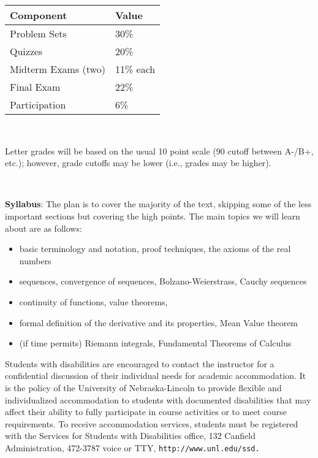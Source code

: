 \documentclass{amsart}
\begin{document}
\begin{tabular}{|l|l|}
\hline
Component & Value \\
\hline \hline
Problem Sets & 30\% \\
\hline
Quizzes & 20\% \\
\hline
Midterm Exams (two) &  11\% each \\
\hline
Final Exam & 22\% \\
\hline
Participation & 6\%\\
\hline
\end{tabular}


\


\noindent Letter grades will be based on the usual 10 point scale (90 cutoff between A-/B+, etc.); however, grade cutoffs may be lower (i.e., grades may be higher).

\

\noindent
{\bf Syllabus}: The plan is to cover the majority of the text, skipping some of the less important sections but covering the high points.
The main topics we will learn about are as follows:
\begin{itemize}
  \item 
    basic terminology and  notation, proof techniques, the axioms of the real numbers
    \item sequences, convergence of sequences, Bolzano-Weierstrass, Cauchy sequences
      \item continuity of functions,  value theorems,
\item formal definition of the derivative and its properties, Mean Value theorem
  \item (if time permits) Riemann integrals, Fundamental Theorems of Calculus \\ 
  \end{itemize}

\bigskip

 Students with disabilities are encouraged to contact the instructor for a confidential discussion of their
individual needs for academic accommodation. It is the policy of the University of Nebraska-Lincoln to provide flexible and individualized accommodation to
students with documented disabilities that may affect their ability to fully participate in course activities or to meet course requirements. To receive
accommodation services, students must be registered with the Services for Students with Disabilities office, 132 Canfield Administration, 472-3787 voice or TTY,
{\tt http://www.unl.edu/ssd.}
\end{document}
